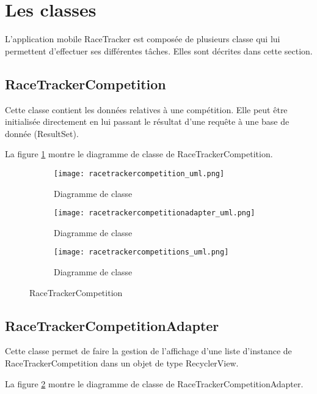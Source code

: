 \section{Les classes}

L'application mobile RaceTracker est composée de plusieurs classe qui lui permettent d'effectuer ses différentes tâches. Elles sont décrites dans cette section.

\subsection{RaceTrackerCompetition}

Cette classe contient les données relatives à une compétition. Elle peut être initialisée directement en lui passant le résultat d'une requête à une base de donnée (ResultSet).

La figure \ref{fig:racetrackercompetition_uml} montre le diagramme de classe de RaceTrackerCompetition.

\begin{figure}[htb!]
    \centering
    \begin{subfigure}[htb]{1\textwidth}
		\texttt{[image: racetrackercompetition\_uml.png]} 
		\caption{Diagramme de classe}
		\label{fig:racetrackercompetition_uml}
    \end{subfigure}
    \begin{subfigure}[htb]{1\textwidth}
		\texttt{[image: racetrackercompetitionadapter\_uml.png]} 
		\caption{Diagramme de classe}
		\label{fig:racetrackercompetitionadapter_uml}
    \end{subfigure}
    \begin{subfigure}[htb]{1\textwidth}
		\texttt{[image: racetrackercompetitions\_uml.png]} 
		\caption{Diagramme de classe}
		\label{fig:racetrackercompetitions_uml}
    \end{subfigure}
    \caption{RaceTrackerCompetition}\label{fig:racetrackercompetition_fig}
\end{figure}

\subsection{RaceTrackerCompetitionAdapter}

Cette classe permet de faire la gestion de l'affichage d'une liste d'instance de RaceTrackerCompetition dans un objet de type RecyclerView.

La figure \ref{fig:racetrackercompetitionadapter_uml} montre le diagramme de classe de RaceTrackerCompetitionAdapter.

